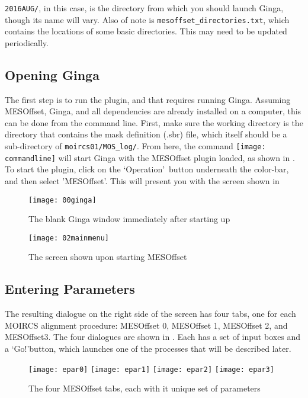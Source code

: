 \documentclass[10pt]{article}
\begin{document}
\texttt{2016AUG/}, in this case, is the directory from which you should launch Ginga, though its name will vary.
Also of note is \texttt{mesoffset\_directories.txt}, which contains the locations of some basic directories. This may need to be updated periodically.

\subsection{Opening Ginga}

The first step is to run the plugin, and that requires running Ginga. Assuming MESOffset, Ginga, and all dependencies are already installed on a computer, this can be done from the command line. First, make sure the working directory is the directory that contains the mask definition (.sbr) file, which itself should be a sub-directory of \texttt{moircs01/MOS\_log/}. From here, the command
\texttt{[image: commandline]}
will start Ginga with the MESOffset plugin loaded, as shown in . To start the plugin, click on the \lq Operation\rq\ button underneath the color-bar, and then select 'MESOffset'. This will present you with the screen shown in 

\begin{figure}[!ht]
	\centering
	\texttt{[image: 00ginga]}
	\caption{The blank Ginga window immediately after starting up}
 	\label{fig:ginga}
\end{figure}

\begin{figure}[!ht]
	\centering
	\texttt{[image: 02mainmenu]}
	\caption{The screen shown upon starting MESOffset}
 	\label{fig:mainmenu}
\end{figure}

\subsection{Entering Parameters}

The resulting dialogue on the right side of the screen has four tabs, one for each MOIRCS alignment procedure: MESOffset 0, MESOffset 1, MESOffset 2, and MESOffset3. The four dialogues are shown in . Each has a set of input boxes and a \lq Go!\rq button, which launches one of the processes that will be described later.

\begin{figure}[!ht]
    \centering
    \texttt{[image: epar0]}
    \texttt{[image: epar1]}
    \texttt{[image: epar2]}
    \texttt{[image: epar3]}
    \caption{The four MESOffset tabs, each with it unique set of parameters}
    \label{fig:tabs}
\end{figure}
\end{document}
